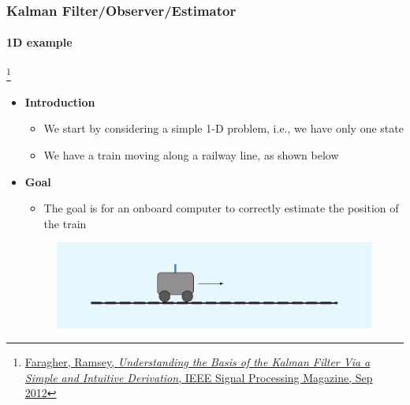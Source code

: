 \documentclass{beamer}
\newenvironment{changemargin}[2]
	{
	  	\begin{list}{}
		{
			\setlength{\topsep}{0pt}%
			\setlength{\leftmargin}{#1}%
			\setlength{\rightmargin}{#2}%
			\setlength{\listparindent}{\parindent}%
			\setlength{\itemindent}{\parindent}%
			\setlength{\parsep}{\parskip}%
		}
	  	\item[]
		}
		{\end{list}
	}
\begin{document}
\begin{frame}[plain]
\frametitle{Kalman Filter/Observer/Estimator}
\framesubtitle{1D example}

\footnote{\tiny\hspace{-0.23in} \href{http://www.cl.cam.ac.uk/~rmf25/papers/Understanding the Basis of the Kalman Filter.pdf}{Faragher, Ramsey, \emph{Understanding the Basis of the Kalman Filter Via a Simple and Intuitive Derivation}, IEEE Signal Processing Magazine, Sep 2012}}
\scriptsize
\begin{changemargin}{-1.3in}{0in}
\begin{itemize}\scriptsize
\item \textbf{Introduction}
\begin{itemize}\scriptsize
\item We start by considering a simple 1-D problem, i.e., we have only one state
\item We have a train moving along a railway line, as shown below
\end{itemize}
\item \textbf{Goal}
\begin{itemize}\scriptsize
\item The goal is for an onboard computer to correctly estimate the position of the train
\end{itemize}
\begin{figure}[h]
\centering
\includegraphics[width=1.35\textwidth]{figs/2012_MAG_Understanding_the_Basis_of_the_Kalman_Filter_fig0.pdf}
\end{figure}
\end{itemize}
\end{changemargin}
\end{frame}
\end{document}
